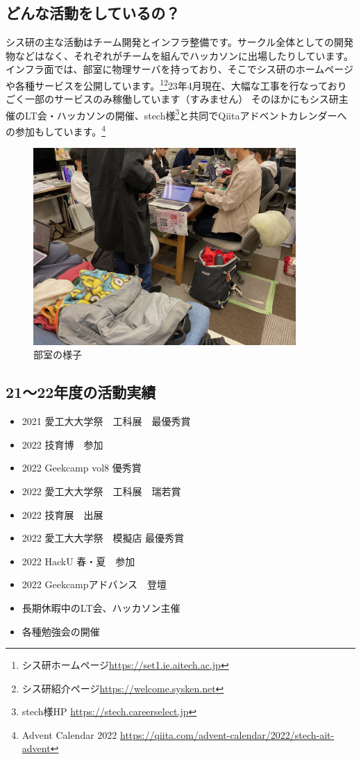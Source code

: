 \subsection{どんな活動をしているの？}
シス研の主な活動はチーム開発とインフラ整備です。サークル全体としての開発物などはなく、それぞれがチームを組んでハッカソンに出場したりしています。 \\
インフラ面では、部室に物理サーバを持っており、そこでシス研のホームページや各種サービスを公開しています。\footnote{シス研ホームページ\url{https://set1.ie.aitech.ac.jp}}\footnote{シス研紹介ページ\url{https://welcome.sysken.net}}23年4月現在、大幅な工事を行なっておりごく一部のサービスのみ稼働しています（すみません）
そのほかにもシス研主催のLT会・ハッカソンの開催、stech様\footnote{stech様HP \url{https://stech.careerselect.jp}}と共同でQiitaアドベントカレンダーへの参加もしています。\footnote{Advent Calendar 2022 \url{https://qiita.com/advent-calendar/2022/stech-ait-advent}}
\begin{figure}[bht]
  \centering
  \includegraphics[width=10cm]{./image/02-AboutSysken/room.jpg}
  \caption{部室の様子}
\end{figure}

\subsection{21〜22年度の活動実績}
\begin{itemize}
  \item 2021 愛工大大学祭　工科展　最優秀賞
  \item 2022 技育博　参加
  \item 2022 Geekcamp vol8 優秀賞
  \item 2022 愛工大大学祭　工科展　瑞若賞
  \item 2022 技育展　出展
  \item 2022 愛工大大学祭　模擬店 最優秀賞
  \item 2022 HackU 春・夏　参加
  \item 2022 Geekcampアドバンス　登壇
  \item 長期休暇中のLT会、ハッカソン主催
  \item 各種勉強会の開催
\end{itemize}

